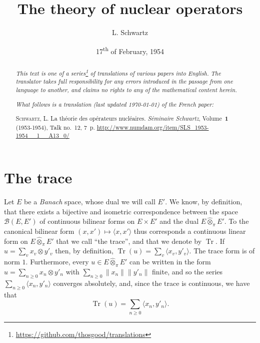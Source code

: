 \documentclass{article}
\theoremstyle{plain}
\theoremstyle{definition}
\newcommand{\BB}{\mathcal{B}}
\newcommand{\cprojotimes}{\widehat{\otimes}_\pi}
\newcommand{\tr}{\operatorname{Tr}}
\renewcommand{\geq}{\geqslant}
\newcommand{\oldpage}[1]{\marginpar{\footnotesize$\Big\vert$ \textit{p.~#1}}}
\begin{document}
\renewcommand{\abstractname}{Translator's note.}

\title{The theory of nuclear operators}
\author{L. Schwartz}
\date{17\textsuperscript{th} of February, 1954}
\maketitle

\begin{abstract}
  \renewcommand*{\thefootnote}{\fnsymbol{footnote}}
  \emph{This text is one of a series\footnote{\url{https://github.com/thosgood/translations}} of translations of various papers into English.}
  \emph{The translator takes full responsibility for any errors introduced in the passage from one language to another, and claims no rights to any of the mathematical content herein.}
  
  \emph{What follows is a translation (last updated \today) of the French paper:}

  \medskip\noindent
  \textsc{Schwartz, L}. La th\'{e}orie des op\'{e}rateurs nucl\'{e}aires. \emph{S\'{e}minaire Schwartz}, Volume~\textbf{1} (1953-1954), Talk no.~12, 7~p. {\footnotesize\url{http://www.numdam.org/item/SLS_1953-1954__1__A13_0/}}
\end{abstract}

\tableofcontents



\section{The trace}
\label{section1}

\oldpage{1}

Let $E$ be a \emph{Banach} space, whose dual we will call $E'$.
We know, by definition, that there exists a bijective and isometric correspondence between the space $\BB(E,E')$ of continuous bilinear forms on $E\times E'$ and the dual $E\cprojotimes E'$.
To the canonical bilinear form $(x,x')\mapsto\langle x,x'\rangle$ thus corresponds a continuous linear form on $E\cprojotimes E'$ that we call ``the trace'', and that we denote by $\tr$.
If $u=\sum_v x_v\otimes y'_v$ then, by definition, $\tr(u)=\sum_v\langle x_v,y'_v\rangle$.
The trace form is of norm $1$.
Furthermore, every $u\in E\cprojotimes E'$ can be written in the form $u=\sum_{n\geq0}x_n\otimes y'_n$ with $\sum_{n\geq0}\|x_n\|\|y'_n\|$ finite, and so the series $\sum_{n\geq0}\langle x_n,y'_n\rangle$ converges absolutely, and, since the trace is continuous, we have that
\[
  \tr(u) = \sum_{n\geq0} \langle x_n, y'_n \rangle.
\]
\end{document}

